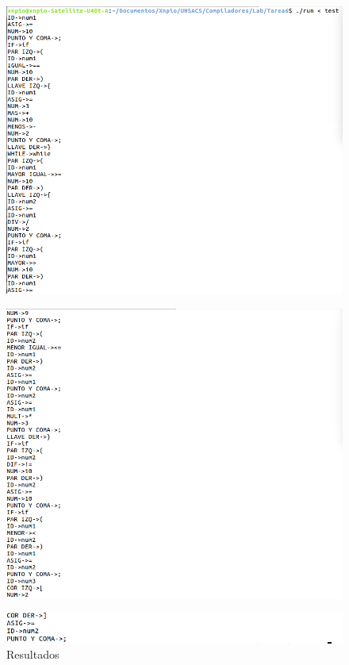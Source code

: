 \documentclass[a4paper,12pt]{article}
\begin{document}
\begin{figure}[H]
 \centering
 \includegraphics[scale = 0.5]{2.png}
\end{figure}
\begin{figure}[H]
 \centering
 \includegraphics[scale = 0.5]{3.png}
\end{figure}
\begin{figure}[H]
 \centering
 \includegraphics[scale = 0.5]{4.png}
 \caption{Resultados}
\end{figure}
\end{document}
